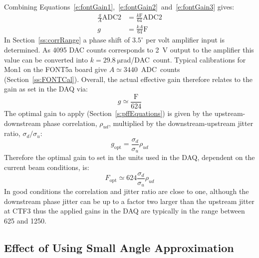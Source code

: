 Combining Equations~\ref{e:fontGain1},~\ref{e:fontGain2}~and~\ref{e:fontGain3} gives:
\begin{align}
\frac{g}{A}\mathrm{ADC2} &= \frac{k\mathrm{F}}{64}\mathrm{ADC2} \nonumber \\
g &= \frac{kA}{64}\mathrm{F} \label{e:fontGain4}
\end{align}
In Section~\ref{ss:corrRange} a phase shift of \(3.5^\circ\) per volt amplifier input is determined. As 4095 DAC counts corresponds to 2~V output to the amplifier this value can be converted into \(k = 29.8~\mathrm{\mu}\)rad/DAC~count. Typical calibrations for Mon1 on the FONT5a board give \(A \simeq 3440\)~ADC~counts (Section~\ref{ss:FONTCal}). Overall, the actual effective gain therefore relates to the gain as set in the DAQ via:
\begin{equation}
g \simeq \frac{\mathrm{F}}{624}
\end{equation}
The optimal gain to apply (Section~\ref{s:pffEquations}) is given by the upstream-downstream phase correlation, \(\rho_{ud}\), multiplied by the downstream-upstream jitter ratio, \(\sigma_{d}/\sigma_{u}\):
\begin{equation}
g_{\mathrm{opt}} = \frac{\sigma_{d}}{\sigma_{u}} \rho_{ud}  
\end{equation}
Therefore the optimal gain to set in the units used in the DAQ, dependent on the current beam conditions, is:
\begin{equation}
F_{\mathrm{opt}} \simeq 624 \frac{\sigma_{d}}{\sigma_{u}} \rho_{ud}
\label{e:fontOptGain}
\end{equation}
In good conditions the correlation and jitter ratio are close to one, although the downstream phase jitter can be up to a factor two larger than the upstream jitter at CTF3 thus the applied gains in the DAQ are typically in the range between 625 and 1250.

\subsection{Effect of Using Small Angle Approximation}
\label{ss:fontSmallAng}

